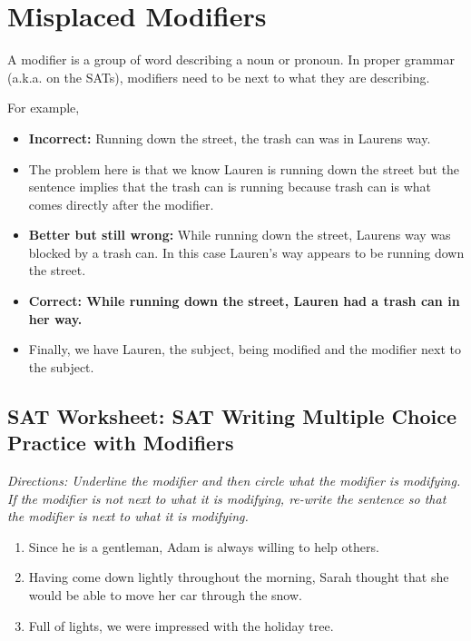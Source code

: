 \section{Misplaced Modifiers}
A modifier is a group of word describing a noun or pronoun. In proper grammar (a.k.a. on the SATs), modifiers need to be next to what they are describing.


For example,

\bigskip
\begin{itemize}
\item{\textbf{Incorrect:} Running down the street, the trash can was in Laurens way.}
\item{The problem here is that we know Lauren is running down the street but the sentence implies that the trash can is running because trash can is what comes directly after the modifier.}
\item{\textbf{Better but still wrong:} While running down the street, Laurens way was blocked by a trash can. In this case Lauren's way appears to be running down the street.}
\item{\textbf{Correct: While running down the street, Lauren had a trash can in her way.}}
\item{Finally, we have Lauren, the subject, being modified and the modifier next to the subject.}
\end{itemize} 

\subsection{SAT Worksheet: SAT Writing Multiple Choice Practice with Modifiers}
\textit{Directions: Underline the modifier and then circle what the modifier is modifying. If the modifier is not next to what it is modifying, re-write the sentence so that the modifier is next to what it is modifying.}

\bigskip
\begin{enumerate}
\item{Since he is a gentleman, Adam is always willing to help others.}
\item{Having come down lightly throughout the morning, Sarah thought that she would be able to move her car through the snow.}
\item{Full of lights, we were impressed with the holiday tree.}

\end{enumerate}
